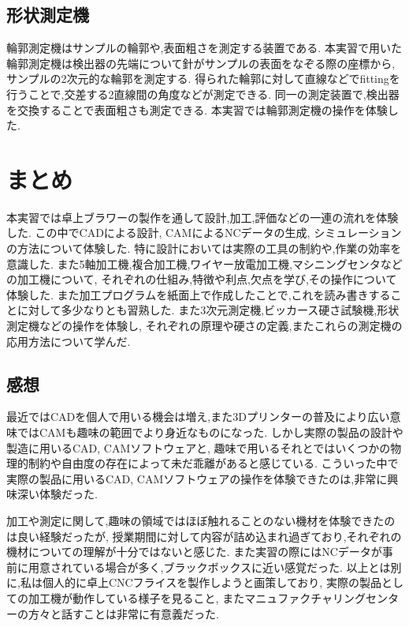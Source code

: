 \documentclass[uplatex,a4j,11pt,dvipdfmx]{jsreport}
\begin{document}
  \section{形状測定機}
  輪郭測定機はサンプルの輪郭や,表面粗さを測定する装置である.
  本実習で用いた輪郭測定機は検出器の先端について針がサンプルの表面をなぞる際の座標から,サンプルの2次元的な輪郭を測定する.
  得られた輪郭に対して直線などでfittingを行うことで,交差する2直線間の角度などが測定できる.
  同一の測定装置で,検出器を交換することで表面粗さも測定できる.
  本実習では輪郭測定機の操作を体験した.
  \chapter{まとめ}
  本実習では卓上ブラワーの製作を通して設計,加工,評価などの一連の流れを体験した.
  この中でCADによる設計, CAMによるNCデータの生成, シミュレーションの方法について体験した.
  特に設計においては実際の工具の制約や,作業の効率を意識した.
  また5軸加工機,複合加工機,ワイヤー放電加工機,マシニングセンタなどの加工機について,
  それぞれの仕組み,特徴や利点,欠点を学び,その操作について体験した.
  また加工プログラムを紙面上で作成したことで,これを読み書きすることに対して多少なりとも習熟した.
  また3次元測定機,ビッカース硬さ試験機,形状測定機などの操作を体験し,
  それぞれの原理や硬さの定義,またこれらの測定機の応用方法について学んだ.
  \section{感想}
  最近ではCADを個人で用いる機会は増え,また3Dプリンターの普及により広い意味ではCAMも趣味の範囲でより身近なものになった.
  しかし実際の製品の設計や製造に用いるCAD, CAMソフトウェアと,
  趣味で用いるそれとではいくつかの物理的制約や自由度の存在によって未だ乖離があると感じている.
  こういった中で実際の製品に用いるCAD, CAMソフトウェアの操作を体験できたのは,非常に興味深い体験だった.

  加工や測定に関して,趣味の領域ではほぼ触れることのない機材を体験できたのは良い経験だったが,
  授業期間に対して内容が詰め込まれ過ぎており,それぞれの機材についての理解が十分ではないと感じた.
  また実習の際にはNCデータが事前に用意されている場合が多く,ブラックボックスに近い感覚だった.
  以上とは別に,私は個人的に卓上CNCフライスを製作しようと画策しており,
  実際の製品としての加工機が動作している様子を見ること,
  またマニュファクチャリングセンターの方々と話すことは非常に有意義だった.

  {
    \titleformat{\chapter}[block]{\huge\bfseries}{}{0pt}{}
    
  }
\end{document}
